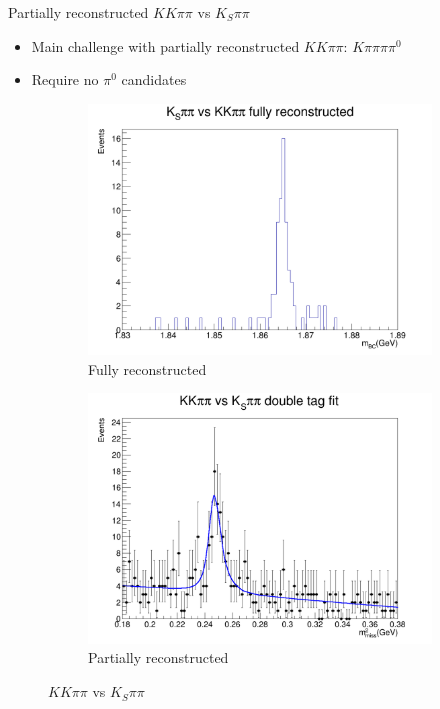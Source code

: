 \documentclass{beamer}
\begin{document}
\begin{frame}{Partially reconstructed $KK\pi\pi$ vs $K_S\pi\pi$}
  \begin{itemize}
    \item{Main challenge with partially reconstructed $KK\pi\pi$: $K\pi\pi\pi\pi^0$}
    \item{Require no $\pi^0$ candidates}
  \end{itemize}
  \begin{figure}
    \centering
    \vspace{-0.2cm}
    \begin{subfigure}{0.50\textwidth}
      \includegraphics[width = 1.0\textwidth]{Plots/KKpipiVersusKSpipiMBC.png}
      \caption{Fully reconstructed}
    \end{subfigure}%
    \begin{subfigure}{0.50\textwidth}
      \includegraphics[width = 1.0\textwidth]{Plots/KSpipiPartReco_Inclusive_DoubleTagYield.png}
      \caption{Partially reconstructed}
    \end{subfigure}
    \caption{$KK\pi\pi$ vs $K_S\pi\pi$}
  \end{figure}
\end{frame}
\end{document}
